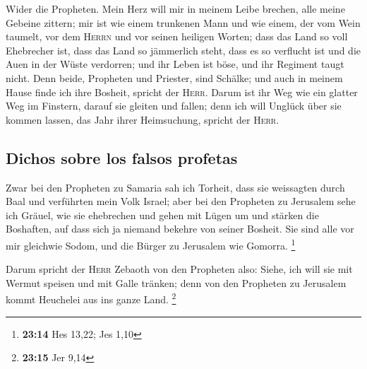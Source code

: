  Wider die Propheten. Mein Herz will mir in meinem Leibe
brechen, alle meine Gebeine zittern; mir ist wie einem trunkenen Mann
und wie einem, der vom Wein taumelt, vor dem \textsc{Herrn} und vor
seinen heiligen Worten;  dass das Land so voll Ehebrecher
ist, dass das Land so jämmerlich steht, dass es so verflucht ist und die
Auen in der Wüste verdorren; und ihr Leben ist böse, und ihr Regiment
taugt nicht.  Denn beide, Propheten und Priester, sind
Schälke; und auch in meinem Hause finde ich ihre Bosheit, spricht der
\textsc{Herr}.  Darum ist ihr Weg wie ein glatter Weg im
Finstern, darauf sie gleiten und fallen; denn ich will Unglück über sie
kommen lassen, das Jahr ihrer Heimsuchung, spricht der \textsc{Herr}.

\hypertarget{dichos-sobre-los-falsos-profetas}{%
\subsection{Dichos sobre los falsos
profetas}\label{dichos-sobre-los-falsos-profetas}}

 Zwar bei den Propheten zu Samaria sah ich Torheit, dass
sie weissagten durch Baal und verführten mein Volk Israel;
 aber bei den Propheten zu Jerusalem sehe ich Gräuel, wie
sie ehebrechen und gehen mit Lügen um und stärken die Boshaften, auf
dass sich ja niemand bekehre von seiner Bosheit. Sie sind alle vor mir
gleichwie Sodom, und die Bürger zu Jerusalem wie Gomorra. \footnote{\textbf{23:14}
  Hes 13,22; Jes 1,10}

 Darum spricht der \textsc{Herr} Zebaoth von den
Propheten also: Siehe, ich will sie mit Wermut speisen und mit Galle
tränken; denn von den Propheten zu Jerusalem kommt Heuchelei aus ins
ganze Land. \footnote{\textbf{23:15} Jer 9,14}

